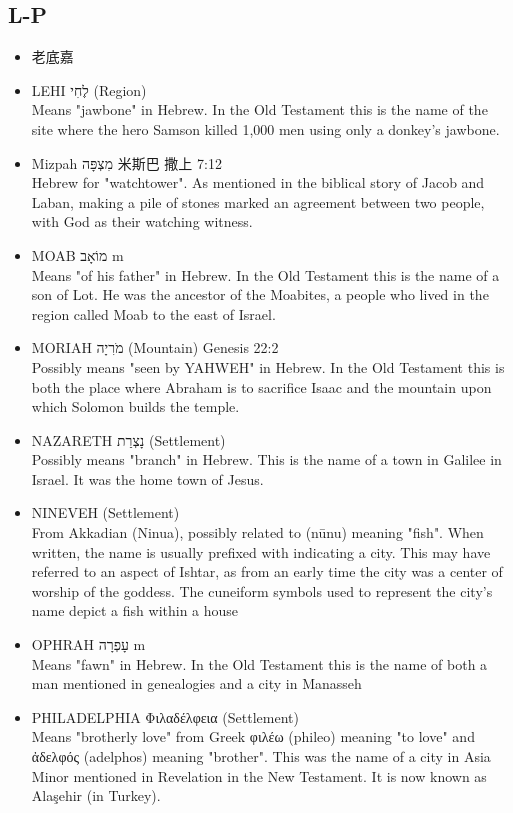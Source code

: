 \subsection{L-P}
\begin{itemize} 
\itemsep-.25em
\item 老底嘉  
\item LEHI לֶחִי (Region) \\
Means "jawbone" in Hebrew. In the Old Testament this is the name of the site where the hero Samson killed 1,000 men using only a donkey's jawbone.
\item Mizpah  מִצְפָּה 米斯巴 撒上 7:12 \\
Hebrew for "watchtower". As mentioned in the biblical story of Jacob and Laban, making a pile of stones marked an agreement between two people, with God as their watching witness.
\item MOAB מוֹאָב m \\
Means "of his father" in Hebrew. In the Old Testament this is the name of a son of Lot. He was the ancestor of the Moabites, a people who lived in the region called Moab to the east of Israel.
\item MORIAH מֹרִיָה (Mountain) Genesis 22:2 \\
Possibly means "seen by YAHWEH" in Hebrew. In the Old Testament this is both the place where Abraham is to sacrifice Isaac and the mountain upon which Solomon builds the temple.
\item NAZARETH נָצְרַת (Settlement) \\
Possibly means "branch" in Hebrew. This is the name of a town in Galilee in Israel. It was the home town of Jesus.
\item NINEVEH (Settlement) \\
From Akkadian (Ninua), possibly related to (nūnu) meaning "fish". When written, the name is usually prefixed with indicating a city. This may have referred to an aspect of Ishtar, as from an early time the city was a center of worship of the goddess. The cuneiform symbols used to represent the city's name depict a fish within a house
\item OPHRAH עָפְרָה m \\
Means "fawn" in Hebrew. In the Old Testament this is the name of both a man mentioned in genealogies and a city in Manasseh
\item PHILADELPHIA Φιλαδέλφεια (Settlement) \\
Means "brotherly love" from Greek φιλέω (phileo) meaning "to love" and ἀδελφός (adelphos) meaning "brother". This was the name of a city in Asia Minor mentioned in Revelation in the New Testament. It is now known as Alaşehir (in Turkey). 
\end{itemize} 

